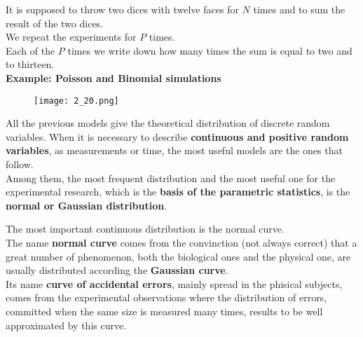 \begin{frame}
  \begin{small}
    It is supposed to throw two dices with twelve faces for $ N $ times and to sum the result of the two dices.\\
    \vspace*{.2cm}
    We repeat the experiments for $ P $ times.\\
    \vspace*{.2cm}
    Each of the $ P $ times we write down how many times the sum is equal to two and to thirteen.\\
    \vspace*{.2cm}
    \centering
    \textbf{Example: Poisson and Binomial simulations}\\              
  \end{small}
  \begin{figure}
    \texttt{[image: 2\_20.png]}
  \end{figure}
\end{frame}




\begin{frame}
  \vspace*{.5cm}
  All the previous models give the theoretical distribution of discrete random variables. When it is necessary to describe \textbf{continuous and positive random variables}, as measurements or time, the most useful models are the ones that follow.\\
  \vspace*{.5cm}
  Among them, the most frequent distribution and the most useful one for the experimental research, which is the \textbf{basis of the parametric statistics}, is the \textbf{normal or Gaussian distribution}.
\end{frame}


\begin{frame}
  \vspace*{.5cm}
  The most important continuous distribution is the normal curve.\\
  \vspace*{.5cm}
  The name \textbf{normal curve} comes from the convinction (not always correct) that a great number of phenomenon, both the biological ones and the physical one, are usually distributed according the \textbf{Gaussian curve}.\\
  \vspace*{.5cm}
  Its name \textbf{curve of accidental errors}, mainly spread in the phisical subjects, comes from the experimental observations where the distribution of errors, committed when the same size is measured many times, results to be well approximated by this curve.
\end{frame}

